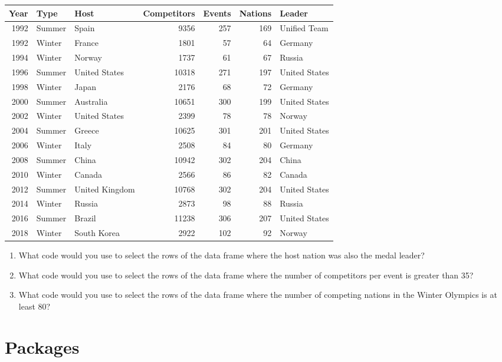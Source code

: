 \documentclass[
]{book}
\providecommand{\tightlist}{%
  \setlength{\itemsep}{0pt}\setlength{\parskip}{0pt}}
\begin{document}
\begin{tabular}{r|l|l|r|r|r|l}
\hline
Year & Type & Host & Competitors & Events & Nations & Leader\\
\hline
1992 & Summer & Spain & 9356 & 257 & 169 & Unified Team\\
\hline
1992 & Winter & France & 1801 & 57 & 64 & Germany\\
\hline
1994 & Winter & Norway & 1737 & 61 & 67 & Russia\\
\hline
1996 & Summer & United States & 10318 & 271 & 197 & United States\\
\hline
1998 & Winter & Japan & 2176 & 68 & 72 & Germany\\
\hline
2000 & Summer & Australia & 10651 & 300 & 199 & United States\\
\hline
2002 & Winter & United States & 2399 & 78 & 78 & Norway\\
\hline
2004 & Summer & Greece & 10625 & 301 & 201 & United States\\
\hline
2006 & Winter & Italy & 2508 & 84 & 80 & Germany\\
\hline
2008 & Summer & China & 10942 & 302 & 204 & China\\
\hline
2010 & Winter & Canada & 2566 & 86 & 82 & Canada\\
\hline
2012 & Summer & United Kingdom & 10768 & 302 & 204 & United States\\
\hline
2014 & Winter & Russia & 2873 & 98 & 88 & Russia\\
\hline
2016 & Summer & Brazil & 11238 & 306 & 207 & United States\\
\hline
2018 & Winter & South Korea & 2922 & 102 & 92 & Norway\\
\hline
\end{tabular}

\begin{enumerate}
\def\labelenumi{\arabic{enumi}.}
\setcounter{enumi}{7}
\tightlist
\item
  What code would you use to select the rows of the data frame where the host nation was also the medal leader?
\item
  What code would you use to select the rows of the data frame where the number of competitors per event is greater than 35?
\item
  What code would you use to select the rows of the data frame where the number of competing nations in the Winter Olympics is at least 80?
\end{enumerate}

\hypertarget{packages}{%
\section{Packages}\label{packages}}
\end{document}
